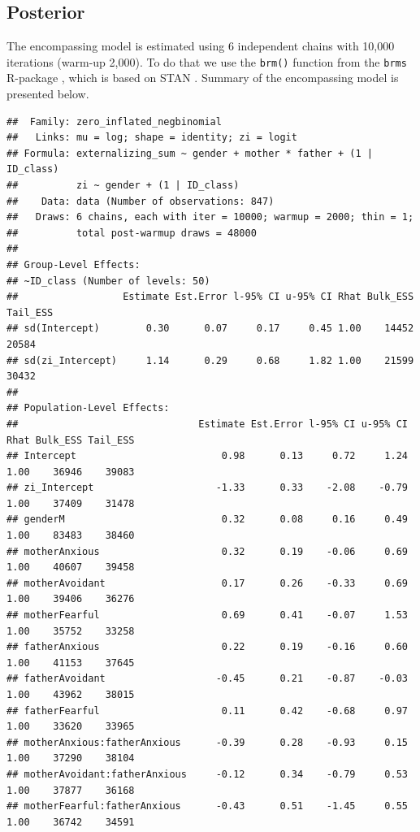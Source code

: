 \documentclass[
]{book}
\begin{document}
\hypertarget{posterior}{%
\subsection{Posterior}\label{posterior}}

The encompassing model is estimated using 6 independent chains with 10,000 iterations (warm-up 2,000). To do that we use the \texttt{brm()} function from the \texttt{brms} R-package \citep{burknerBrmsPackageBayesian2017, burknerAdvancedBayesianMultilevel2018a}, which is based on STAN \citep{standevelopmentteamRStanInterfaceStan2020}. Summary of the encompassing model is presented below.

\begin{verbatim}
##  Family: zero_inflated_negbinomial 
##   Links: mu = log; shape = identity; zi = logit 
## Formula: externalizing_sum ~ gender + mother * father + (1 | ID_class) 
##          zi ~ gender + (1 | ID_class)
##    Data: data (Number of observations: 847) 
##   Draws: 6 chains, each with iter = 10000; warmup = 2000; thin = 1;
##          total post-warmup draws = 48000
## 
## Group-Level Effects: 
## ~ID_class (Number of levels: 50) 
##                  Estimate Est.Error l-95% CI u-95% CI Rhat Bulk_ESS Tail_ESS
## sd(Intercept)        0.30      0.07     0.17     0.45 1.00    14452    20584
## sd(zi_Intercept)     1.14      0.29     0.68     1.82 1.00    21599    30432
## 
## Population-Level Effects: 
##                               Estimate Est.Error l-95% CI u-95% CI Rhat Bulk_ESS Tail_ESS
## Intercept                         0.98      0.13     0.72     1.24 1.00    36946    39083
## zi_Intercept                     -1.33      0.33    -2.08    -0.79 1.00    37409    31478
## genderM                           0.32      0.08     0.16     0.49 1.00    83483    38460
## motherAnxious                     0.32      0.19    -0.06     0.69 1.00    40607    39458
## motherAvoidant                    0.17      0.26    -0.33     0.69 1.00    39406    36276
## motherFearful                     0.69      0.41    -0.07     1.53 1.00    35752    33258
## fatherAnxious                     0.22      0.19    -0.16     0.60 1.00    41153    37645
## fatherAvoidant                   -0.45      0.21    -0.87    -0.03 1.00    43962    38015
## fatherFearful                     0.11      0.42    -0.68     0.97 1.00    33620    33965
## motherAnxious:fatherAnxious      -0.39      0.28    -0.93     0.15 1.00    37290    38104
## motherAvoidant:fatherAnxious     -0.12      0.34    -0.79     0.53 1.00    37877    36168
## motherFearful:fatherAnxious      -0.43      0.51    -1.45     0.55 1.00    36742    34591

\end{verbatim}
\end{document}

